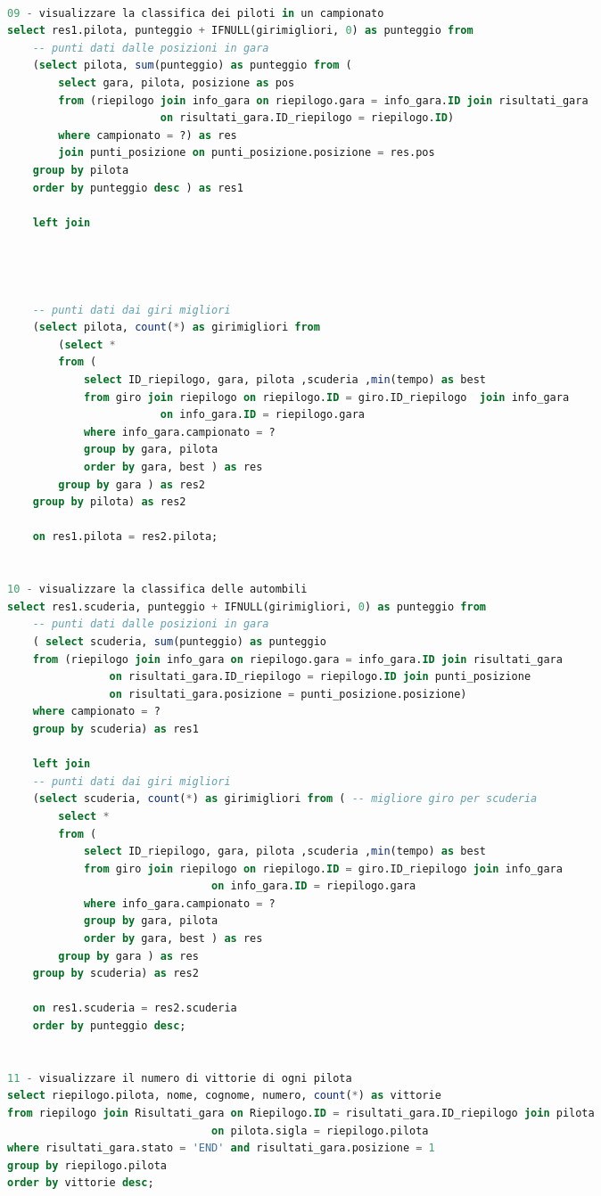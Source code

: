\documentclass[a4paper,12pt]{report}
\begin{document}
{\begin{adjustwidth}{-85pt}{1pt}
\begin{lstlisting}[language=SQL]
	
09 - visualizzare la classifica dei piloti in un campionato
select res1.pilota, punteggio + IFNULL(girimigliori, 0) as punteggio from
	-- punti dati dalle posizioni in gara
	(select pilota, sum(punteggio) as punteggio from (
		select gara, pilota, posizione as pos
		from (riepilogo join info_gara on riepilogo.gara = info_gara.ID join risultati_gara 
						on risultati_gara.ID_riepilogo = riepilogo.ID)
		where campionato = ?) as res
		join punti_posizione on punti_posizione.posizione = res.pos
	group by pilota
	order by punteggio desc ) as res1

	left join 
	
	
	
	
	-- punti dati dai giri migliori
	(select pilota, count(*) as girimigliori from 
		(select * 
		from (
			select ID_riepilogo, gara, pilota ,scuderia ,min(tempo) as best
			from giro join riepilogo on riepilogo.ID = giro.ID_riepilogo  join info_gara 
						on info_gara.ID = riepilogo.gara
			where info_gara.campionato = ?
			group by gara, pilota
			order by gara, best ) as res
		group by gara ) as res2
	group by pilota) as res2

	on res1.pilota = res2.pilota;

	
10 - visualizzare la classifica delle autombili
select res1.scuderia, punteggio + IFNULL(girimigliori, 0) as punteggio from 
	-- punti dati dalle posizioni in gara
	( select scuderia, sum(punteggio) as punteggio
	from (riepilogo join info_gara on riepilogo.gara = info_gara.ID join risultati_gara 
				on risultati_gara.ID_riepilogo = riepilogo.ID join punti_posizione 
				on risultati_gara.posizione = punti_posizione.posizione)
	where campionato = ? 
	group by scuderia) as res1

	left join 
	-- punti dati dai giri migliori
	(select scuderia, count(*) as girimigliori from ( -- migliore giro per scuderia
		select *
		from (
			select ID_riepilogo, gara, pilota ,scuderia ,min(tempo) as best
			from giro join riepilogo on riepilogo.ID = giro.ID_riepilogo join info_gara 
								on info_gara.ID = riepilogo.gara
			where info_gara.campionato = ?
			group by gara, pilota
			order by gara, best ) as res
		group by gara ) as res
	group by scuderia) as res2

	on res1.scuderia = res2.scuderia
	order by punteggio desc;

	
11 - visualizzare il numero di vittorie di ogni pilota
select riepilogo.pilota, nome, cognome, numero, count(*) as vittorie
from riepilogo join Risultati_gara on Riepilogo.ID = risultati_gara.ID_riepilogo join pilota 
								on pilota.sigla = riepilogo.pilota
where risultati_gara.stato = 'END' and risultati_gara.posizione = 1
group by riepilogo.pilota
order by vittorie desc;



\end{lstlisting}
\end{adjustwidth}}
\end{document}
